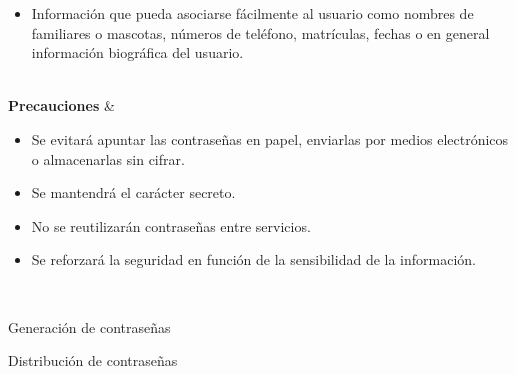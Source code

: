 \begin{enumerate}[label=\alph*)]
\begin{table}[H]
{\begin{itemize}[label={}, leftmargin=0pt, topsep=0pt, itemsep=0pt]
            \item Información que pueda asociarse fácilmente al usuario como nombres de familiares o mascotas, números de teléfono, matrículas, fechas o en general información biográfica del usuario.
            \end{itemize} \\ \hline
            \textbf{Precauciones} &
            \begin{itemize}[label={}, leftmargin=0pt, topsep=0pt, itemsep=0pt]
            \item Se evitará apuntar las contraseñas en papel, enviarlas por medios electrónicos o almacenarlas sin cifrar.
            \item Se mantendrá el carácter secreto.
            \item No se reutilizarán contraseñas entre servicios.
            \item Se reforzará la seguridad en función de la sensibilidad de la información.
            \end{itemize} \\ \hline
        }
        \caption{Generación de contraseñas}
        \label{tab:guia-sgsi-generación-contraseñas}
        \normalsize
    \end{table}

    \vspace{1em}

    \begin{table}[H]
        \centering
        \small
        \caption{Distribución de contraseñas}
        \label{tab:guia-sgsi-distribución-contraseñas}
        \normalsize
    \end{table}

    \vspace{1em}


\end{enumerate}
